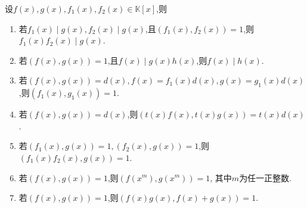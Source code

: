 \documentclass[lang=cn,newtx,10pt,scheme=chinese]{elegantbook}
\begin{document}
\begin{proposition}[互素多项式和最大公因式的基本性质]\label{proposition:互素多项式和最大公因式的基本性质}
设$f(x),g(x),f_1(x),f_2(x)\in \mathbb{K}[x]$,则
\begin{enumerate}[(1)]
\item 若\(f_1(x)\mid g(x), f_2(x)\mid g(x)\),且\((f_1(x), f_2(x)) = 1\),则\(f_1(x)f_2(x)\mid g(x)\).
\item  若\((f(x), g(x)) = 1\),且\(f(x)\mid g(x)h(x)\),则\(f(x)\mid h(x)\).
\item  若\((f(x), g(x)) = d(x), f(x)=f_1(x)d(x), g(x)=g_1(x)d(x)\),则\((f_1(x), g_1(x)) = 1\).
\item  若\((f(x), g(x)) = d(x)\),则\((t(x)f(x), t(x)g(x)) = t(x)d(x)\).
\item  若\((f_1(x), g(x)) = 1, (f_2(x), g(x)) = 1\),则\((f_1(x)f_2(x), g(x)) = 1\).

\item 若\((f(x),g(x))=1\),则\((f(x^m),g(x^m))=1\), 其中\(m\)为任一正整数.

\item  若\((f(x),g(x)) = 1\),则\((f(x)g(x),f(x)+g(x)) = 1\).
\end{enumerate}
\end{proposition}
\end{document}

